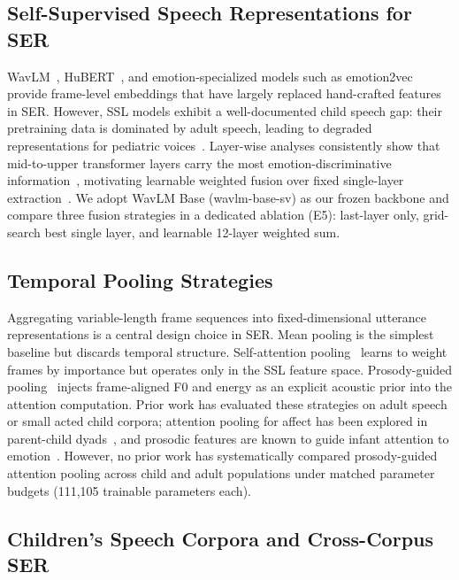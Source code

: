 \documentclass[11pt,a4paper]{article}
\begin{document}
\subsection{Self-Supervised Speech Representations for SER}

WavLM~\cite{chen2022wavlm}, HuBERT~\cite{hsu2021hubert}, and
emotion-specialized models such as emotion2vec~\cite{ma2024emotion2vec}
provide frame-level embeddings that have largely replaced hand-crafted features
in SER. However, SSL models exhibit a well-documented child speech gap: their
pretraining data is dominated by adult speech, leading to degraded
representations for pediatric voices~\cite{meng2022data,fan2023draft}.
Layer-wise analyses consistently show that mid-to-upper transformer
layers carry the most emotion-discriminative information~\cite{pasad2021layer,
upadhyay2024wavlm,chiu2025probing},
motivating learnable weighted fusion over fixed single-layer
extraction~\cite{rozen2024layer}. We adopt WavLM Base (wavlm-base-sv) as our
frozen backbone and compare three fusion strategies in a dedicated ablation
(E5): last-layer only, grid-search best single layer, and learnable 12-layer
weighted sum.

\subsection{Temporal Pooling Strategies}

Aggregating variable-length frame sequences into fixed-dimensional utterance
representations is a central design choice in SER. Mean pooling is the
simplest baseline but discards temporal structure. Self-attention
pooling~\cite{lin2017structured} learns to weight frames by importance but
operates only in the SSL feature space. Prosody-guided
pooling~\cite{triantafyllopoulos2023prosody} injects frame-aligned F0 and
energy as an explicit acoustic prior into the attention computation. Prior work has evaluated these strategies on adult speech or small acted child
corpora; attention pooling for affect has been explored in parent-child
dyads~\cite{chen2023mit}, and prosodic features are known to guide infant
attention to emotion~\cite{kao2022jslhr}. However, no prior work has
systematically compared prosody-guided attention pooling across child and adult
populations under matched parameter budgets (111,105 trainable parameters
each).

\subsection{Children's Speech Corpora and Cross-Corpus SER}
\end{document}
